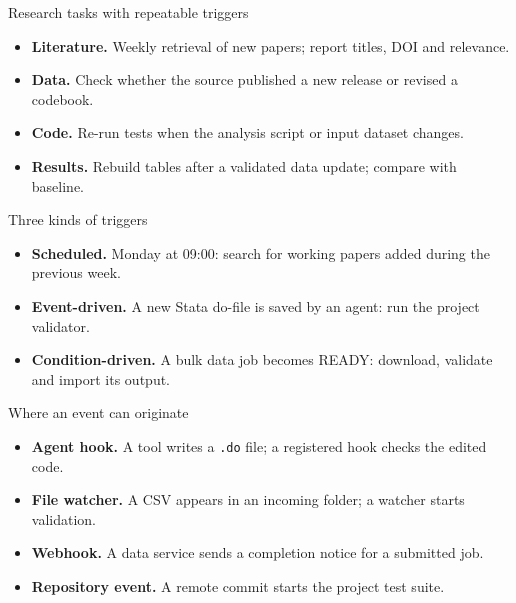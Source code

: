 
\begin{frame}{Research tasks with repeatable triggers}
\begin{itemize}\setlength{\itemsep}{0.55em}
\item \textbf{Literature.} Weekly retrieval of new papers; report titles, DOI and relevance.
\item \textbf{Data.} Check whether the source published a new release or revised a codebook.
\item \textbf{Code.} Re-run tests when the analysis script or input dataset changes.
\item \textbf{Results.} Rebuild tables after a validated data update; compare with baseline.
\end{itemize}
\end{frame}

\begin{frame}{Three kinds of triggers}
\begin{itemize}\setlength{\itemsep}{0.7em}
\item \textbf{Scheduled.} Monday at 09:00: search for working papers added during the previous week.
\item \textbf{Event-driven.} A new Stata do-file is saved by an agent: run the project validator.
\item \textbf{Condition-driven.} A bulk data job becomes READY: download, validate and import its output.
\end{itemize}
\end{frame}

\begin{frame}{Where an event can originate}
\begin{itemize}\setlength{\itemsep}{0.45em}
\item \textbf{Agent hook.} A tool writes a \texttt{.do} file; a registered hook checks the edited code.
\item \textbf{File watcher.} A CSV appears in an incoming folder; a watcher starts validation.
\item \textbf{Webhook.} A data service sends a completion notice for a submitted job.
\item \textbf{Repository event.} A remote commit starts the project test suite.
\end{itemize}
\end{frame}


